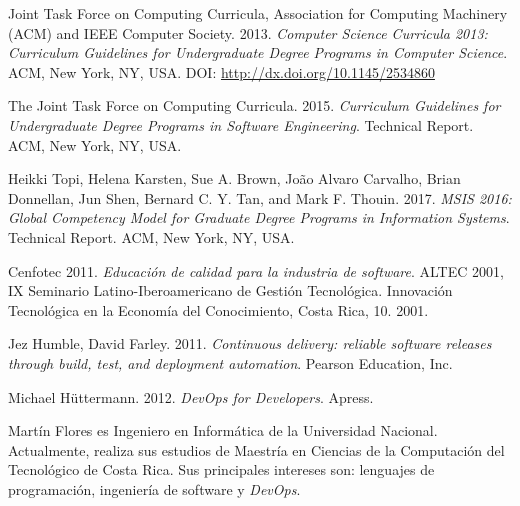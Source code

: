 \documentclass[journal]{IEEEtran}
\begin{document}
\begin{thebibliography}{1}
Joint Task Force on Computing Curricula, Association for Computing Machinery (ACM) and IEEE Computer Society. 2013. \emph{Computer Science Curricula 2013: Curriculum Guidelines for Undergraduate Degree Programs in Computer Science}. ACM, New York, NY, USA. DOI: \url{http://dx.doi.org/10.1145/2534860}

The Joint Task Force on Computing Curricula. 2015. \emph{Curriculum Guidelines for Undergraduate Degree Programs in Software Engineering}. Technical Report. ACM, New York, NY, USA. 

Heikki Topi, Helena Karsten, Sue A. Brown, João Alvaro Carvalho, Brian Donnellan, Jun Shen, Bernard C. Y. Tan, and Mark F. Thouin. 2017. \emph{MSIS 2016: Global Competency Model for Graduate Degree Programs in Information Systems}. Technical Report. ACM, New York, NY, USA.

Cenfotec 2011. \emph{Educación de calidad para la industria de software}. ALTEC 2001, IX Seminario Latino-Iberoamericano de Gestión Tecnológica. Innovación Tecnológica en la Economía del Conocimiento, Costa Rica, 10. 2001.


Jez Humble, David Farley. 2011. \emph{Continuous delivery: reliable software releases through build, test, and deployment automation}. Pearson Education, Inc.

Michael Hüttermann. 2012. \emph{DevOps for Developers}. Apress.

\end{thebibliography}

% 

\begin{IEEEbiography}{Martín Flores}
es Ingeniero en Informática de la Universidad Nacional. Actualmente, realiza sus estudios de Maestría en Ciencias de la Computación del Tecnológico de Costa Rica. Sus principales intereses son: lenguajes de programación, ingeniería de software y \emph{DevOps}.
\end{IEEEbiography}
\end{document}
